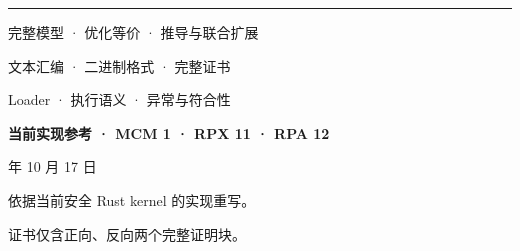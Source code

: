 \documentclass[UTF8,10pt,a4paper,oneside,fontset=fandol]{ctexbook}
\begin{document}
\frontmatter
\hypersetup{pageanchor=false}
\begin{titlepage}
\color{rpxblue}
\vspace*{12mm}
\par
\vspace{7mm}
\par
\vspace{4mm}
\par
\vspace{9mm}
\noindent\rule{\textwidth}{1pt}\par
\vspace{7mm}
\par
{}\par
\vspace{10mm}
\noindent 完整模型 · 优化等价 · 推导与联合扩展\par
\noindent 文本汇编 · 二进制格式 · 完整证书\par
\noindent Loader · 执行语义 · 异常与符合性\par
\vfill
\noindent\textbf{当前实现参考 · MCM 1 · RPX 11 · RPA 12}\par
{} 年 10 月 17 日\par
\vspace{5mm}
\noindent 依据当前安全 Rust kernel 的实现重写。\par
\noindent 证书仅含正向、反向两个完整证明块。\par
\end{titlepage}
\hypersetup{pageanchor=true}

\tableofcontents
\mainmatter








\appendix

\end{document}
